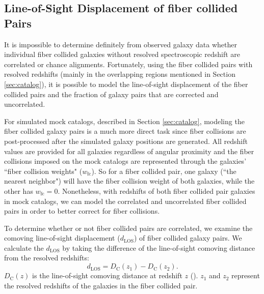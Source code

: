 \documentclass{emulateapj}
\begin{document}
\subsection{Line-of-Sight Displacement of fiber collided Pairs} \label{sec:dlos}
It is impossible to determine definitely from observed galaxy data whether individual fiber collided galaxies without resolved spectroscopic redshift are correlated or chance alignments. Fortunately, using the fiber collided pairs with resolved redshifts (mainly in the overlapping regions mentioned in Section \ref{sec:catalog}), it is possible to model the line-of-sight displacement of the fiber collided pairs and the fraction of galaxy pairs that are corrected and uncorrelated. 

For simulated mock catalogs, described in Section \ref{sec:catalog}, modeling the fiber collided galaxy pairs is a much more direct task since fiber collisions are post-processed after the simulated galaxy positions are generated. All redshift values are provided for all galaxies regardless of angular proximity and the fiber collisions imposed on the mock catalogs are represented through the galaxies' ``fiber collision weights" ($w_\mathrm{fc}$). So for a fiber collided pair, one galaxy (``the nearest neighbor") will have the fiber collision weight of both galaxies, while the other has $w_\mathrm{fc} = 0$. Nonetheless, with redshifts of both fiber collided pair galaxies in mock catalogs, we can model the correlated and uncorrelated fiber collided pairs in order to better correct for fiber collisions. 

To determine whether or not fiber collided pairs are correlated, we examine the comoving line-of-sight displacement ($d_{\mathrm{LOS}}$) of fiber collided galaxy pairs. We calculate the $d_{\mathrm{LOS}}$ by taking the difference of the line-of-sight comoving distance from the resolved redshifts: 
\begin{equation}
d_{\mathrm{LOS}} = D_{\mathrm{C}} (z_1) - D_{\mathrm{C}} (z_2). 
\end{equation}
$D_{\mathrm{C}}(z)$ is the line-of-sight comoving distance at redshift $z$ (\citealt{Hogg:1999aa}). $z_1$ and $z_2$ represent the resolved redshifts of the galaxies in the fiber collided pair.
\end{document}

